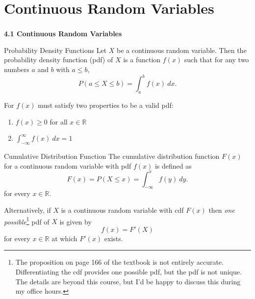 \section{Continuous Random Variables}

\begin{frame}
  \frametitle{}

  \begin{center}
    \Large{\textbf{4.1 Continuous Random Variables}}
  \end{center}


\end{frame}

\begin{frame}

  \begin{block}{Probability Density Functions}
    Let $X$ be a continuous random variable. Then the probability density function (pdf) of $X$ is a function $f(x)$ such that for any two numbers $a$ and $b$ with $a \leq b$,
    \[
      P(a \leq X \leq b)=\int_a^b f(x)~dx.
    \]

    \bigskip

    For $f(x)$ must satisfy two properties to be a valid pdf:
    \begin{enumerate}
    \item $f(x) \geq 0$ for all $x \in \mathbb{R}$
    \item $\int_{-\infty}^\infty f(x)~dx = 1$
    \end{enumerate}
    
  \end{block}
\end{frame}


\begin{frame}

  \begin{block}{Cumulative Distribution Function}
    The cumulative distribution function $F(x)$ for a continuous random variable with pdf $f(x)$ is defined as
    \[
      F(x)=P(X \leq x)=\int_{-\infty}^x f(y)~dy.
    \]
    for every $x \in \mathbb R$.

    \bigskip

    Alternatively, if $X$ is a continuous random variable with cdf $F(x)$ then \textit{one possible}\footnote{The proposition on page 166 of the textbook is not entirely accurate. Differentiating the cdf provides one possible pdf, but the pdf is not unique. The details are beyond this course, but I'd be happy to discuss this during my office hours.} pdf of $X$ is given by
    \[
      f(x)=F'(X)
    \]
    for every $x \in \mathbb R$ at which $F'(x)$ exists. 
  \end{block}
\end{frame}

